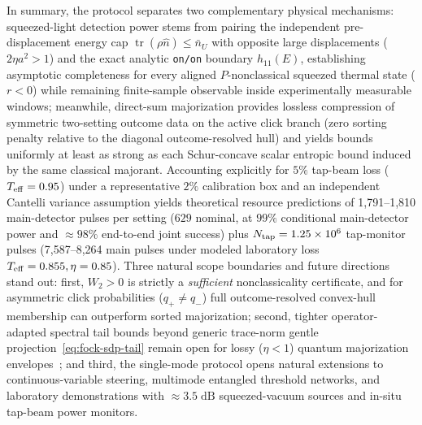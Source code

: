 \documentclass{iopjournal}
\newcommand{\tr}{\operatorname{tr}}
\newcommand{\nU}{\bar n_U}
\begin{document}
In summary, the protocol separates two complementary physical mechanisms: squeezed-light detection power stems from pairing the independent pre-displacement energy cap $\tr(\rho\hat n)\le \nU$ with opposite large displacements ($2\eta a^2 > 1$) and the exact analytic \texttt{on/on} boundary $h_{11}(E)$, establishing asymptotic completeness for every aligned $P$-nonclassical squeezed thermal state ($r < 0$) while remaining finite-sample observable inside experimentally measurable windows; meanwhile, direct-sum majorization provides lossless compression of symmetric two-setting outcome data on the active click branch (zero sorting penalty relative to the diagonal outcome-resolved hull) and yields bounds uniformly at least as strong as each Schur-concave scalar entropic bound induced by the same classical majorant. Accounting explicitly for $5\%$ tap-beam loss ($T_{\rm eff} = 0.95$) under a representative $2\%$ calibration box and an independent Cantelli variance assumption yields theoretical resource predictions of 1,791--1,810 main-detector pulses per setting ($629$ nominal, at $99\%$ conditional main-detector power and $\approx 98\%$ end-to-end joint success) plus $N_{\rm tap} = 1.25 \times 10^6$ tap-monitor pulses (7,587--8,264 main pulses under modeled laboratory loss $T_{\rm eff}=0.855, \eta=0.85$). Three natural scope boundaries and future directions stand out: first, $W_2 > 0$ is strictly a \emph{sufficient} nonclassicality certificate, and for asymmetric click probabilities ($q_+ \neq q_-$) full outcome-resolved convex-hull membership can outperform sorted majorization; second, tighter operator-adapted spectral tail bounds beyond generic trace-norm gentle projection~\eqref{eq:fock-sdp-tail} remain open for lossy ($\eta < 1$) quantum majorization envelopes~\cite{YangQiaoOptimization2026}; and third, the single-mode protocol opens natural extensions to continuous-variable steering, multimode entangled threshold networks, and laboratory demonstrations with $\approx 3.5\;\mathrm{dB}$ squeezed-vacuum sources and in-situ tap-beam power monitors.


\end{document}
